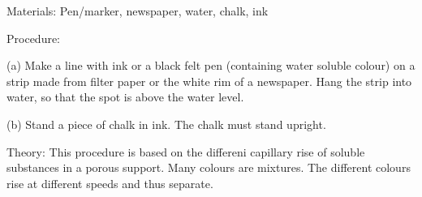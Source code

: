 \begin{multicols}{2}
\begin{description*}
\item[Materials:]{Pen/marker, newspaper, water, chalk, ink}
\item[Procedure:]{(a) Make a line with ink or a black felt pen (containing water soluble
colour) on a strip made from filter paper or the white rim of a newspaper. Hang the strip into
water, so that the spot is above the water level.

(b) Stand a piece of chalk in ink. The chalk must
stand upright.}
\item[Theory:]{This procedure is based on the differeni
capillary rise of soluble substances in a porous
support. Many colours are mixtures. The different
colours rise at different speeds and thus separate.}
\end{description*}



\end{multicols}

\pagebreak